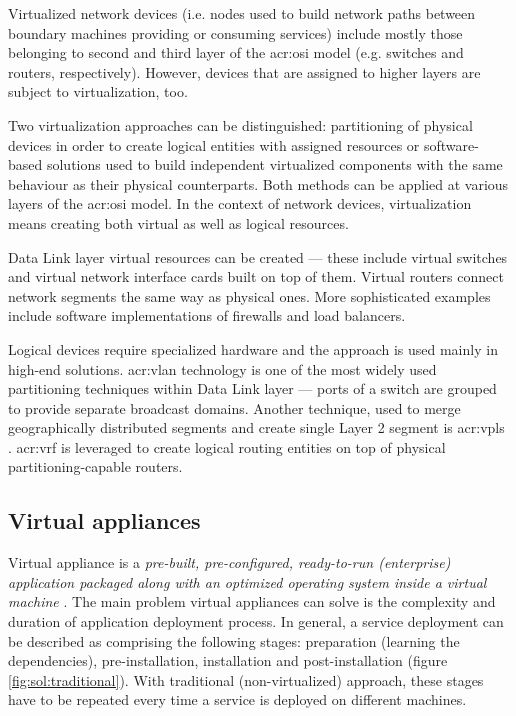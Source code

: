 \documentclass[11pt,openany]{book}
\begin{document}
        Virtualized network devices (i.e. nodes used to build network paths between boundary machines providing or
        consuming services) include mostly those belonging to second and third layer of the \gls{acr:osi} model (e.g.
        switches and routers, respectively). However, devices that are assigned to higher layers are subject to
        virtualization, too.

        Two virtualization approaches can be distinguished: partitioning of physical devices in order to create logical
        entities with assigned resources or software-based solutions used to build independent virtualized components
        with the same behaviour as their physical counterparts. Both methods can be applied at various layers of the
        \gls{acr:osi} model. In the context of network devices, virtualization means creating both virtual as well as
        logical resources.

        Data Link layer virtual resources can be created --- these include virtual switches and virtual network
        interface cards built on top of them. Virtual routers connect network segments the same way as physical ones.
        More sophisticated examples include software implementations of firewalls and load balancers.

        Logical devices require specialized hardware and the approach is used mainly in high-end solutions.
        \gls{acr:vlan} technology is one of the most widely used partitioning techniques within Data Link layer ---
        ports of a switch are grouped to provide separate broadcast domains. Another technique, used to merge
        geographically distributed segments and create single Layer 2 segment is \gls{acr:vpls} \cite{moreno}.
        \gls{acr:vrf} is leveraged to create logical routing entities on top of physical partitioning-capable routers.


      \subsection{Virtual appliances}
      \label{sub:}

        Virtual appliance is a \textit{pre-built, pre-configured, ready-to-run (enterprise) application packaged along
        with an optimized operating system inside a virtual machine} \cite{changhua}. The main problem virtual
        appliances can solve is the complexity and duration of application deployment process.  In general, a service
        deployment can be described as comprising the following stages: preparation (learning the dependencies),
        pre-installation, installation and post-installation (figure \ref{fig:sol:traditional}). With traditional
        (non-virtualized) approach, these stages have to be repeated every time a service is deployed on different
        machines.
\end{document}
